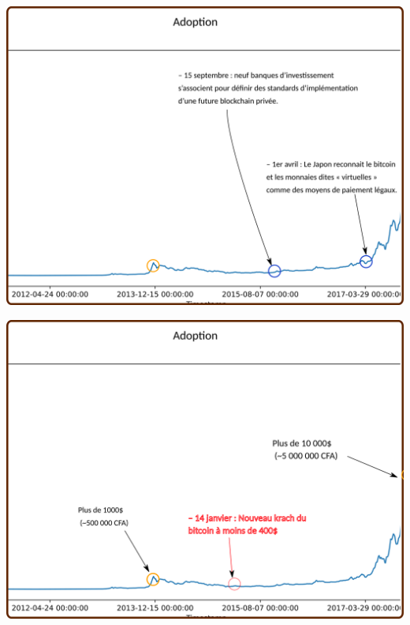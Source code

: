 \documentclass[presentation]{beamer}
\begin{document}
\begin{frame}[label={sec:org89c0f6b}]{}
\begin{center}
\includegraphics[width=.95\textwidth]{./Pictures/Timeline/21adoption_japon.png}
\end{center}
\end{frame}

\begin{frame}[label={sec:orgb50e36e}]{}
\begin{center}
\includegraphics[width=.95\textwidth]{./Pictures/Timeline/22adoption_prix.png}
\end{center}
\end{frame}
\end{document}
